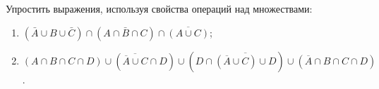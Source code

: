 \question
Упростить выражения, используя свойства операций над множествами:

\begin{enumerate}
	\renewcommand{\labelenumi}{\alph{enumi})}
	\item $(\bar{A} \cup B \cup \bar{C}) \cap(A \cap \bar{B} \cap C) \cap \overline{(A \cup C)}$;
	\item $(A\cap B \cap C \cap D) \cup (\overline{\overline{A}\cup C}\cap D) \cup (D\cap\overline{(\overline{A}\cup C)\cup D})\cup (\overline{A}\cap B\cap C \cap D)$.
\end{enumerate}
